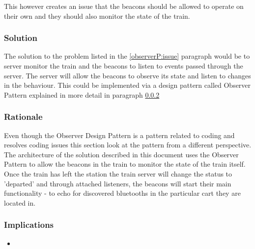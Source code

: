 	This however creates an issue that the beacons should be allowed to operate on their own and they should also monitor the state of the train.
 \fi


\subsubsection{Solution} 
	The solution to the problem listed in the \ref{observerP:issue} paragraph would be to server monitor the train and the beacons to listen to events passed through the server. The server will allow the beacons to observe its state and listen to changes in the behaviour. This could be implemented via a design pattern called Observer Pattern explained in more detail in paragraph \ref{observerP:rationale}


\subsubsection{Rationale} \label{observerP:rationale}
	Even though the Observer Design Pattern is a pattern related to coding and resolves coding issues this section look at the pattern from a different perspective. The architecture of the solution described in this document uses the Observer Pattern to allow the beacons in the train to monitor the state of the train itself. Once the train has left the station the train server will change the status to 'departed' and through attached listeners, the beacons will start their main functionality - to echo for discovered bluetooths in the particular cart they are located in.

\subsubsection{Implications}
\begin{itemize}
  \item 
\end{itemize}


